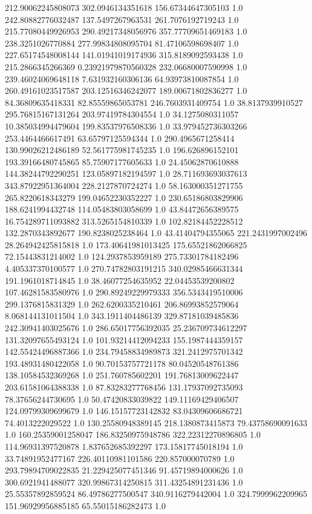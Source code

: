 212.90062245808073	302.0946134351618	156.67344647305103	1.0
242.80882776032487	137.5497267963531	261.7076192719243	1.0
215.77080449926953	290.49217348056976	357.77709651469183	1.0
238.3251026770884	277.99834808095704	81.47106598698407	1.0
227.65174548008144	141.01941019174936	315.8189092593438	1.0
215.2866345266369	0.23921979870560328	232.06680007590998	1.0
239.46024069648118	7.631932160306136	64.93973810087854	1.0
260.49161023517587	203.12516346242077	189.00671802836277	1.0
84.36809635418331	82.85559865053781	246.7603931409754	1.0
38.8137939910527	295.76815167131264	203.97419784304554	1.0
34.1275080311057	10.385034994479604	199.83537976508336	1.0
33.979452736303266	253.4464466617491	63.65797125594344	1.0
290.4965671258414	130.99026212486189	52.561775981745235	1.0
196.626896152101	193.39166480745865	85.75907177605633	1.0
24.45062870610888	144.38244792290251	123.05897182194597	1.0
28.711693693037613	343.87922951364004	228.2127870724274	1.0
58.163000351271755	265.8220618343279	199.04652230352227	1.0
230.65186803829906	188.6241994432748	114.05483803058699	1.0
43.84472656389575	16.754289711093882	313.5265154810339	1.0
102.82184452228512	132.2870343892677	190.8238025238464	1.0
43.41404794355065	221.2431997002496	28.264942425815818	1.0
173.40641981013425	175.65521862066825	72.15443831214002	1.0
124.2937853959189	275.73301784182496	4.405337370100577	1.0
270.74782803191215	340.02985466631344	191.1961018714845	1.0
38.46077254635952	22.04453539200802	107.46281583580976	1.0
290.89249229979333	356.5343419510006	299.1376815831329	1.0
262.6200335210461	206.86993852579064	8.068144131011504	1.0
343.1911404486139	329.87181039485836	242.30941403025676	1.0
286.65017756392035	25.236709734612297	131.32097655493124	1.0
101.93214412094233	155.1987444359157	142.55424496887366	1.0
234.79458834989873	321.2412975701342	193.48931480422058	1.0
90.70153757721178	80.04520548761386	138.10584532369268	1.0
251.760785602201	191.76813009622447	203.61581064388338	1.0
87.83283277768456	131.17937092735093	78.37656244730695	1.0
50.47420833039822	149.11169429406507	124.09799309699679	1.0
146.15157723142832	83.04309606686721	74.4013222029522	1.0
130.25580948389145	218.1380873415873	79.43758690091633	1.0
160.25359001258047	186.83250975948786	322.22312270896805	1.0
114.96931397520878	1.837652685392297	173.15817745018194	1.0
33.74891952477167	226.40110981101586	220.857000070789	1.0
293.79894709022835	21.229425077451346	91.45719894000626	1.0
300.6921941488077	320.99867314250815	311.43254891231436	1.0
25.55357892859524	86.49786277500547	340.9116279442004	1.0
324.7999962209965	151.96929956885185	65.55015186282473	1.0
